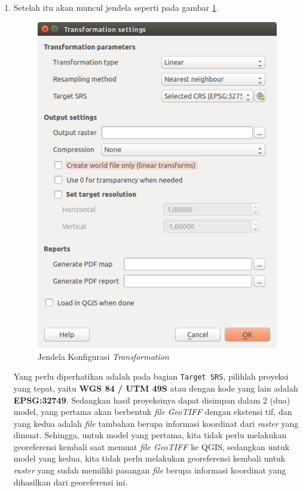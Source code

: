 \begin{enumerate}[1.]
  \item Setelah itu akan muncul jendela seperti pada gambar \ref{fig:transformationwin}.
  
  \begin{figure}[H]
    \centering
    \includegraphics[width=1\textwidth]{./resources/026-transformation-win}
    \caption{Jendela Konfigurasi \textit{Transformation}}
    \label{fig:transformationwin}
  \end{figure}
  
  Yang perlu diperhatikan adalah pada bagian \verb|Target SRS|, pilihlah proyeksi yang tepat, yaitu \textbf{WGS 84 / UTM 49S} atau dengan kode yang lain adalah \textbf{EPSG:32749}. Sedangkan hasil proyeksinya dapat disimpan dalam 2 (dua) model, yang pertama akan berbentuk \textit{file} \textit{GeoTIFF} dengan ekstensi tif, dan yang kedua adalah \textit{file} tambahan berupa informasi koordinat dari \textit{raster} yang dimuat. Sehingga, untuk model yang pertama, kita tidak perlu melakukan georeferensi kembali saat memuat \textit{file GeoTIFF} ke QGIS, sedangkan untuk model yang kedua, kita tidak perlu melakukan georeferensi kembali untuk \textit{raster} yang sudah memiliki pasangan \textit{file} berupa informasi koordinat yang dihasilkan dari georeferensi ini.
  

\end{enumerate}
